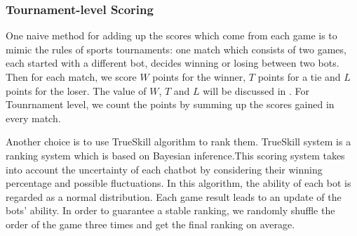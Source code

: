 \subsubsection{Tournament-level Scoring}
One naive method for adding up the scores which come from each game is to mimic the
rules of sports tournaments: 
one match which consists of two games, each started with a different bot, 
decides winning or losing between two bots.
Then for each match, we score $W$ points for the winner,  
$T$ points for a tie and 
$L$ points for the loser.
The value of $W$, $T$ and $L$ will be discussed in . 
For Tounrnament level, 
we count the points by summing up the scores gained in every match.

Another choice is to use TrueSkill \citep{herbrich2007trueskill} algorithm to rank them. 
TrueSkill system is a ranking system which is based on Bayesian inference.This scoring system
takes into account the uncertainty of each chatbot by considering 
their winning percentage and possible fluctuations.
In this algorithm, the ability of each bot is regarded as a normal distribution. Each game result leads to an update of the bots' ability. %
In order to guarantee a stable ranking, we randomly shuffle the order of the game three times and get the final ranking on average.

